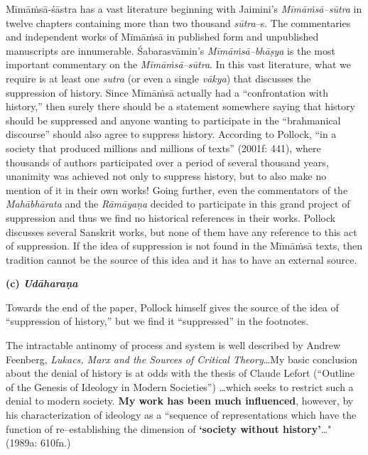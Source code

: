 Mīmāṁsā-śāstra has a vast literature beginning with Jaimini’s \textit{Mīmāṁsā–sūtra} in twelve chapters containing more than two thousand \textit{sūtra}–s. The commentaries and independent works of Mīmāṁsā in published form and unpublished manuscripts are innumerable. Śabarasvāmin’s \textit{Mīmāṁsā–bhāṣya} is the most important commentary on the \textit{Mīmāṁsā–sūtra}. In this vast literature, what we require is at least one \textit{sutra }(or even a single \textit{vākya}) that discusses the suppression of history. Since Mīmāṁsā actually had a “confrontation with history,” then surely there should be a statement somewhere saying that history should be suppressed and anyone wanting to participate in the “brahmanical discourse” should also agree to suppress history. According to Pollock, “in a society that produced millions and millions of texts” (2001f: 441), where thousands of authors participated over a period of several thousand years, unanimity was achieved not only to suppress history, but to also make no mention of it in their own works! Going further, even the commentators of the \textit{Mahābhārata} and the \textit{Rāmāyaṇa} decided to participate in this grand project of suppression and thus we find no historical references in their works. Pollock discusses several Sanskrit works, but none of them have any reference to this act of suppression. If the idea of suppression is not found in the Mīmāṁsā texts, then tradition cannot be the source of this idea and it has to have an external source.

\textbf{(c) \textit{Udāharaṇa}}

Towards the end of the paper, Pollock himself gives the source of the idea of “suppression of history,” but we find it “suppressed” in the footnotes.

\begin{myquote}
The intractable antinomy of process and system is well described by Andrew Feenberg, \textit{Lukacs, Marx and the Sources of Critical Theory}…My basic conclusion about the denial of history is at odds with the thesis of Claude Lefort (“Outline of the Genesis of Ideology in Modern Societies”) …which seeks to restrict such a denial to modern society. \textbf{My work has been much influenced}, however, by his characterization of ideology as a ``sequence of representations which have the function of re–establishing the dimension of \textbf{`society without history'}…" (1989a: 610fn.)
\end{myquote}

